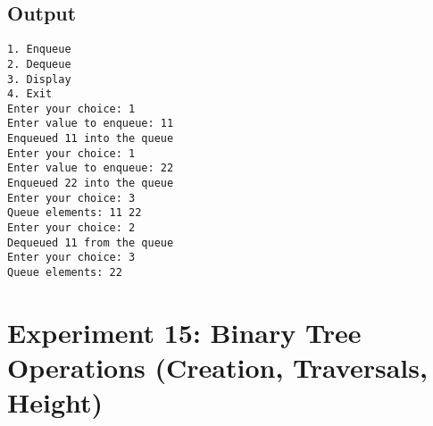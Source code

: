 \documentclass[12pt,a4paper]{article}
\begin{document}
\subsection*{Output}
\begin{tcolorbox}[terminalstyle, title=Sample Output]
\texttt{1. Enqueue\\2. Dequeue\\3. Display\\4. Exit\\
Enter your choice: 1\\
Enter value to enqueue: 11\\
Enqueued 11 into the queue\\
Enter your choice: 1\\
Enter value to enqueue: 22\\
Enqueued 22 into the queue\\
Enter your choice: 3\\
Queue elements: 11 22\\
Enter your choice: 2\\
Dequeued 11 from the queue\\
Enter your choice: 3\\
Queue elements: 22}
\end{tcolorbox}

\newpage
\section*{Experiment 15: Binary Tree Operations (Creation, Traversals, Height)}
\end{document}
